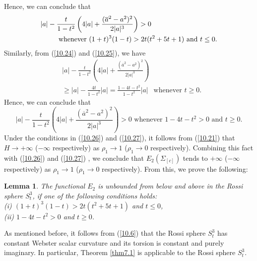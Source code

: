 \documentclass{amsart}
\newtheorem{lem}[theorem]{Lemma}
\theoremstyle{Corollary}
\numberwithin{equation}{section}
\begin{document}
Hence, we can conclude that 
\begin{equation}\label{10.26}
\begin{split}
&|a|-\frac{t}{1-t^2}\left(4|a|+\frac{(\overline{a}^2-a^2)^2}{2|a|^3}\right)>0\\
&\hspace{8mm}\mbox{ whenever } (1+t)^3(1-t)>2t(t^2+5t+1)\mbox{ and }t\leq 0. 
\end{split}
\end{equation}
Similarly, from (\ref{10.24}) and (\ref{10.25}), we have
\begin{equation*}
\begin{split}
&|a|-\frac{t}{1-t^2}\left(4|a|+\frac{(\overline{a}^2-a^2)^2}{2|a|^3}\right)\\
&\geq |a|-\frac{4t}{1-t^2}|a|
=\frac{1-4t-t^2}{1-t^2}|a|~~\mbox{ whenever }t\geq 0.
\end{split}
\end{equation*}
Hence, we can conclude that 
\begin{equation}\label{10.27}
|a|-\frac{t}{1-t^2}\left(4|a|+\frac{(\overline{a}^2-a^2)^2}{2|a|^3}\right)>0\mbox{ whenever } 1-4t-t^2>0\mbox{ and }t\geq 0. 
\end{equation}
Under the conditions in (\ref{10.26}) and (\ref{10.27}), 
it follows from (\ref{10.21}) that 
$H\to +\infty$ ($-\infty$ respectively) as $\rho_1\to 1$ ($\rho_1\to 0$ respectively). 
Combining this fact
with (\ref{10.26}) and (\ref{10.27}) , 
we conclude that 
$E_2(\Sigma_{[c]})$ tends to $+\infty$ ($-\infty$ respectively) as $\rho_1\to 1$ ($\rho_1\to 0$ respectively). 
From this, we prove the following: 

\begin{lem}
The functional $E_2$ is unbounded from below and above in the Rossi sphere 
$S^3_t$, if one of the following conditions holds:\\
(i) $(1+t)^3(1-t)>2t(t^2+5t+1)$ and $t\leq 0$,\\
(ii) $ 1-4t-t^2>0$ and $t\geq 0$.
\end{lem}

 
As mentioned before, it follows
from (\ref{10.6}) that the Rossi sphere $S^3_t$ has constant Webster scalar curvature and 
its torsion is constant and purely imaginary.
In particular, Theorem \ref{thm7.1} is applicable to 
the Rossi sphere $S^3_t$. 
\end{document}
